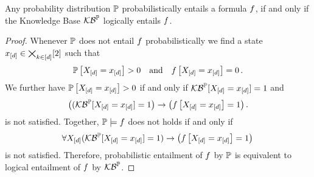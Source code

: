 \begin{theorem}\label{the:entailmentMarkovToKB}
	Any probability distribution $\mathbb{P}$ probabilistically entails a formula $f$, if and only if the Knowledge Base $\mathcal{KB}^{\mathbb{P}}$ logically entails $f$.
\end{theorem}
\begin{proof}
	Whenever $\mathbb{P}$ does not entail $f$ probabilistically we find a state $x_{[d]}\in\bigtimes_{k\in[d]}[2]$ such that
		\[ \mathbb{P}\left[X_{[d]}=x_{[d]}\right] >0 \quad\text{and} \quad f\left[X_{[d]}=x_{[d]}\right] = 0 \, . \]
	We further have $\mathbb{P}\left[X_{[d]}=x_{[d]}\right] >0$ if and only if $\mathcal{KB}^{\mathbb{P}}[X_{[d]}=x_{[d]}]=1$ and
		\[ \big((\mathcal{KB}^{\mathbb{P}}[X_{[d]}=x_{[d]}]=1\big) \rightarrow \big(f\left[X_{[d]}=x_{[d]}\right]=1\big) \, . \]
	is not satisfied.
	Together, $\mathbb{P}\models f$ does not holds if and only if
		\[ \forall X_{[d]} (\mathcal{KB}^{\mathbb{P}}[X_{[d]}=x_{[d]}]=1) \rightarrow \big(f\left[X_{[d]}=x_{[d]}\right]=1\big) \,  \]
	is not satisfied. 
	Therefore, probabilistic entailment of $f$ by $\mathbb{P}$ is equivalent to logical entailment of $f$ by $\mathcal{KB}^{\mathbb{P}}$.
\end{proof}




